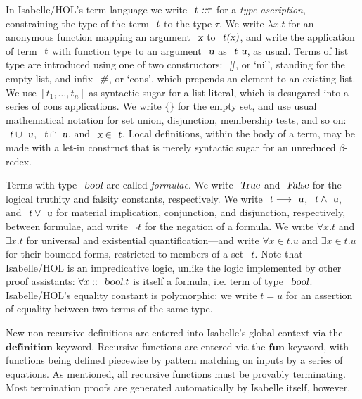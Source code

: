 \documentclass[acmlarge,review,anonymous]{acmart}\settopmatter{printfolios=true}
\begin{document}
In Isabelle/HOL's term language we write $\isa{t} \isa{::} \tau$ for a \emph{type ascription}, constraining the type of the term $\isa{t}$ to the type $\tau$.
We write $\lambda{x}. t$ for an anonymous function mapping an argument $\isa{x}$ to $\isa{t(x)}$, and write the application of term $\isa{t}$ with function type to an argument $\isa{u}$ as $\isa{t\ u}$, as usual.
Terms of list type are introduced using one of two constructors: $\isa{[]}$, or `nil', standing for the empty list, and infix $\isa{\#}$, or `cons', which prepends an element to an existing list.
We use $[t_1, \ldots, t_n]$ as syntactic sugar for a list literal, which is desugared into a series of cons applications.
We write $\{\}$ for the empty set, and use usual mathematical notation for set union, disjunction, membership tests, and so on: $\isa{t} \cup \isa{u}$, $\isa{t} \cap \isa{u}$, and $\isa{x} \in \isa{t}$.
Local definitions, within the body of a term, may be made with a let-in construct that is merely syntactic sugar for an unreduced $\beta$-redex.

Terms with type $\isa{bool}$ are called \emph{formulae}.
We write $\isa{True}$ and $\isa{False}$ for the logical truthity and falsity constants, respectively.
We write $\isa{t} \longrightarrow \isa{u}$, $\isa{t} \wedge \isa{u}$, and $\isa{t} \vee \isa{u}$ for material implication, conjunction, and disjunction, respectively, between formulae, and write $\neg t$ for the negation of a formula.
We write $\forall{x}.t$ and $\exists{x}.t$ for universal and existential quantification---and write $\forall{x{\in}t}.u$ and $\exists{x{\in}t}.u$ for their bounded forms, restricted to members of a set $\isa{t}$.
Note that Isabelle/HOL is an impredicative logic, unlike the logic implemented by other proof assistants: $\forall{x::\isa{bool}}. t$ is itself a formula, i.e. term of type $\isa{bool}$.
Isabelle/HOL's equality constant is polymorphic: we write $t = u$ for an assertion of equality between two terms of the same type.

New non-recursive definitions are entered into Isabelle's global context via the $\mathbf{definition}$ keyword.
Recursive functions are entered via the $\mathbf{fun}$ keyword, with functions being defined piecewise by pattern matching on inputs by a series of equations.
As mentioned, all recursive functions must be provably terminating.
Most termination proofs are generated automatically by Isabelle itself, however.
\end{document}
